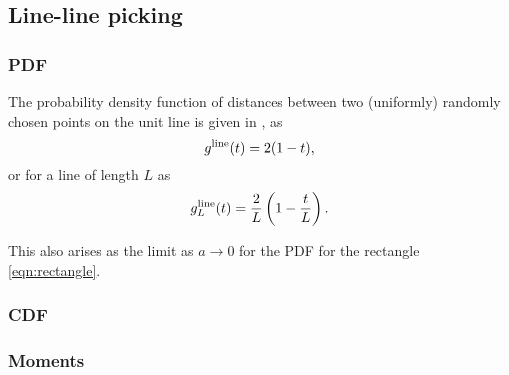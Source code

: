 \subsection{Line-line picking}
\label{sec:line_line}


\subsubsection{PDF}

The probability density function of distances between two (uniformly)
randomly chosen points on the unit line is given in
\cite{weisstein:_line_line_picking,b.ghosh51:_random_rect}, as
\begin{equation}
  \label{eq:line_line}
  g^{\rm line}(t) = 2(1-t),
\end{equation}
or for a line of length $L$ as
\begin{equation}
  \label{eq:line_lineL}
  g^{\rm line}_L(t) = \frac{2}{L} \left( 1-\frac{t}{L} \right).
\end{equation}

This also arises as the limit as $a \rightarrow 0$ for the PDF for the
rectangle \eqref{eqn:rectangle}.

\subsubsection{CDF}


\subsubsection{Moments}




